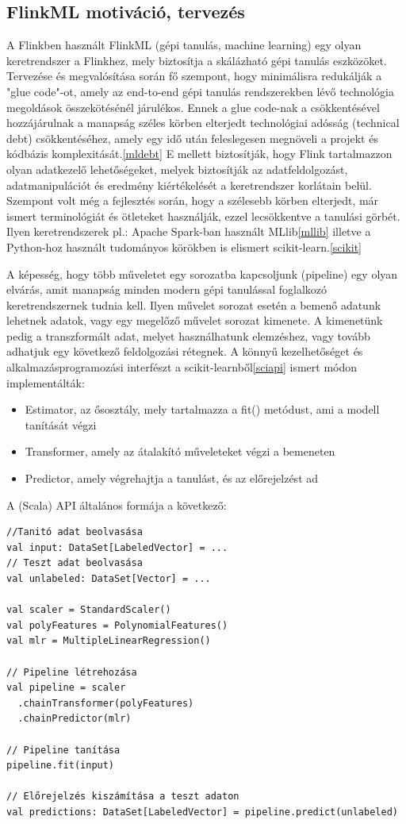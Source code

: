 \documentclass[a4paper,12pt]{article}
\begin{document}
\subsection{FlinkML motiváció, tervezés}

A Flinkben használt FlinkML (gépi tanulás, machine learning) egy olyan keretrendszer a Flinkhez, mely biztosítja a skálázható gépi tanulás eszközöket. Tervezése és megvalósítása során fő szempont, hogy minimálisra redukálják a "glue code"-ot, amely az end-to-end gépi tanulás rendszerekben lévő technológia megoldások összekötésénél járulékos. Ennek a glue code-nak a csökkentésével hozzájárulnak a manapság széles körben elterjedt technológiai adósság (technical debt) csökkentéséhez, amely egy idő után feleslegesen megnöveli a projekt és kódbázis komplexitását.\ref{mldebt} E mellett biztosítják, hogy Flink tartalmazzon olyan adatkezelő lehetőségeket, melyek biztosítják az adatfeldolgozást, adatmanipulációt és eredmény kiértékelését a keretrendszer korlátain belül. Szempont volt még a fejlesztés során, hogy a szélesebb körben elterjedt, már ismert terminológiát és ötleteket használják, ezzel lecsökkentve a tanulási görbét. Ilyen keretrendszerek pl.: Apache Spark-ban használt MLlib\ref{mllib} illetve a Python-hoz használt tudományos körökben is elismert scikit-learn.\ref{scikit} \linebreak

A képesség, hogy több műveletet egy sorozatba kapcsoljunk (pipeline) egy olyan elvárás, amit manapság minden modern gépi tanulással foglalkozó keretrendszernek tudnia kell. Ilyen művelet sorozat esetén a bemenő adatunk lehetnek adatok, vagy egy megelőző művelet sorozat kimenete. A kimenetünk pedig a transzformált adat, melyet használhatunk elemzéshez, vagy tovább adhatjuk egy következő feldolgozási rétegnek.  A könnyű kezelhetőséget és alkalmazásprogramozási interfészt a scikit-learnből\ref{sciapi} ismert módon implementálták: 
\begin{itemize}
\item Estimator, az ősosztály, mely tartalmazza a fit() metódust, ami a modell tanítását végzi
\item Transformer, amely az átalakító műveleteket végzi a bemeneten
\item Predictor, amely végrehajtja a tanulást, és az előrejelzést ad
\end{itemize}

A (Scala) API általános formája a következő:

\begin{lstlisting}[style=Scala]
//Tanitó adat beolvasása
val input: DataSet[LabeledVector] = ...
// Teszt adat beolvasása
val unlabeled: DataSet[Vector] = ...

val scaler = StandardScaler()
val polyFeatures = PolynomialFeatures()
val mlr = MultipleLinearRegression()

// Pipeline létrehozása
val pipeline = scaler
  .chainTransformer(polyFeatures)
  .chainPredictor(mlr)

// Pipeline tanítása
pipeline.fit(input)

// Előrejelzés kiszámítása a teszt adaton
val predictions: DataSet[LabeledVector] = pipeline.predict(unlabeled)
\end{lstlisting}
\end{document}
